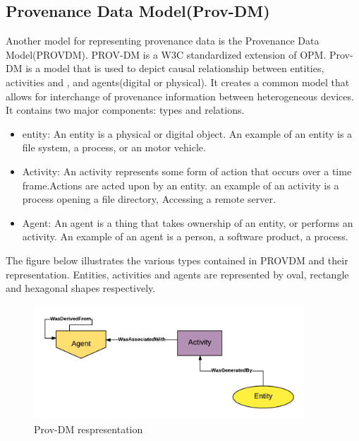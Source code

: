 \subsection{Provenance Data Model(Prov-DM)}

Another model for representing provenance data is the Provenance Data Model(PROV\-DM). PROV-DM is a W3C standardized extension of OPM. Prov-DM is a model that is used to depict causal relationship between entities, activities and , and agents(digital or physical).  It creates a common model that allows for interchange of provenance information between heterogeneous devices. It contains two major components: types and relations. 


\begin{itemize}

\item entity: An entity is a physical or digital object. An example of an entity is a file system, a process, or an motor vehicle.

\item Activity: An activity represents some form of action that occurs over a time frame.Actions are acted upon by an entity. an example of an activity is a process opening a file directory, Accessing a remote server.

\item Agent: An agent is a thing that takes ownership of an entity, or performs an activity. An example of an agent is a person, a software product, a process.
\end{itemize}

The figure below illustrates the various types contained in PROV\-DM and their representation. Entities, activities and agents are represented by oval, rectangle and hexagonal shapes respectively.

\begin{figure}[h]
\begin{center}

\includegraphics[width=4.0in]{prov_dm_1.PNG}
\end{center}
\caption{Prov-DM respresentation }
\end{figure}

